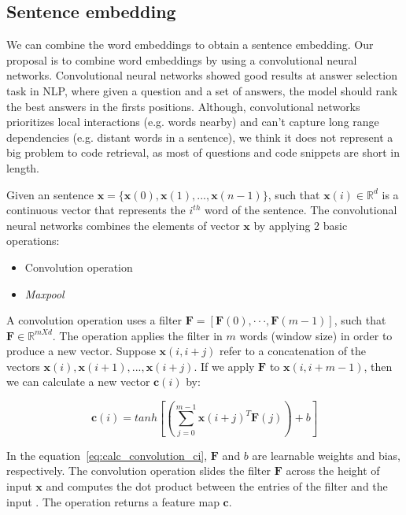 \documentclass[sigconf]{acmart}
\begin{document}
\subsection{Sentence embedding}

We can combine the word embeddings to obtain a sentence embedding. Our proposal is to combine word embeddings by using a convolutional neural networks. Convolutional neural networks showed good results at answer selection task in NLP, where given a question and a set of answers, the model should rank the best answers in the firsts positions. Although, convolutional networks prioritizes local interactions (e.g. words nearby) and can't capture long range dependencies (e.g. distant words in a sentence), we think it does not represent a big problem to code retrieval, as most of questions and code snippets are short in length.

Given an sentence $\bm{x} = \{ \bm{x}(0), \bm{x}(1), . . ., \bm{x}(n - 1) \}$, such that $\bm{x}(i) \in \mathbb{R}^{d}$ is a continuous vector that represents the $i^{th}$ word of the sentence. The convolutional neural networks combines the elements of vector $\bm{x}$ by applying 2 basic operations:

\begin{itemize}
    \item Convolution operation
    \item \textit{Maxpool}
\end{itemize}

A convolution operation uses a filter $\bm{F}  = [\bm{F}(0),· · ·, \bm{F}(m - 1)]$, such that $\bm{F} \in \mathbb{R}^{m X d}$. The operation applies the filter in $m$ words (window size) in order to produce a new vector. Suppose $\bm{x}(i, i + j)$ refer to a concatenation of the vectors $\bm{x}(i), \bm{x}(i + 1), . . ., \bm{x}(i + j)$. If we apply $\bm{F}$ to $\bm{x}(i, i + m - 1)$, then we can calculate a new vector $\bm{c}(i)$ by:

\begin{equation}\label{eq:calc_convolution_ci}
    \bm{c}(i) = tanh \left[\left(\sum_{j=0}^{m - 1} \bm{x}(i + j)^{T}\bm{F}(j)\right) + b\right]
\end{equation}

In the equation~\ref{eq:calc_convolution_ci}, $\bm{F}$ and $b$ are learnable weights and bias, respectively. The convolution operation slides the filter $\bm{F}$ across the height of input $\bm{x}$ and computes the dot product between the entries of the filter and the input \cite{karpathy-course-cnn-2016}. The operation returns a feature map $\bm{c}$.
\end{document}

